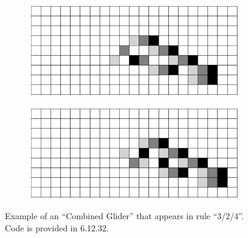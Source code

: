 \documentclass[12pt]{article}
\numberwithin{figure}{section} %
\begin{document}
\begin{figure}[H]
\begin{subfigure}{0.45\textwidth}
     	\subcaption{}
   	\end{subfigure}
	\newline
	\begin{subfigure}{0.45\textwidth}
     	\includegraphics[width=\linewidth]{Section4/35.10}
     	\subcaption{}
   	\end{subfigure}
    	\begin{subfigure}{0.45\textwidth}
     	\includegraphics[width=\linewidth]{Section4/35.11}
     	\subcaption{}
   	\end{subfigure}
   \caption{Example of an “Combined Glider” that appears in rule “3/2/4”. Code is provided in 6.12.32.}
\end{figure}
\end{document}
